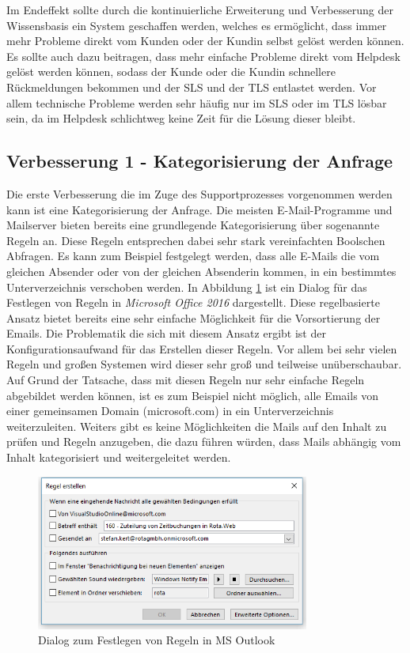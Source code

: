Im Endeffekt sollte durch die kontinuierliche Erweiterung und Verbesserung der Wissensbasis ein System geschaffen werden, welches es ermöglicht, dass immer mehr Probleme direkt vom Kunden oder der Kundin selbst gelöst werden können. Es sollte auch dazu beitragen, dass mehr einfache Probleme direkt vom Helpdesk gelöst werden können, sodass der Kunde oder die Kundin schnellere Rückmeldungen bekommen und der SLS und der TLS entlastet werden. Vor allem technische Probleme werden sehr häufig nur im SLS oder im TLS lösbar sein, da im Helpdesk schlichtweg keine Zeit für die Lösung dieser bleibt. 

\subsection{Verbesserung 1 - Kategorisierung der Anfrage}
\label{sec:improvement1}
Die erste Verbesserung die im Zuge des Supportprozesses vorgenommen werden kann ist eine Kategorisierung der Anfrage. Die meisten E-Mail-Programme und Mailserver bieten bereits eine grundlegende Kategorisierung über sogenannte Regeln an. Diese Regeln entsprechen dabei sehr stark vereinfachten Boolschen Abfragen. Es kann zum Beispiel festgelegt werden, dass alle E-Mails die vom gleichen Absender oder von der gleichen Absenderin kommen, in ein bestimmtes Unterverzeichnis verschoben werden. In Abbildung \ref{fig:outlook-rules} ist ein Dialog für das Festlegen von Regeln in \textit{Microsoft Office 2016} dargestellt. Diese regelbasierte Ansatz bietet bereits eine sehr einfache Möglichkeit für die Vorsortierung der Emails. Die Problematik die sich mit diesem Ansatz ergibt ist der Konfigurationsaufwand für das Erstellen dieser Regeln. Vor allem bei sehr vielen Regeln und großen Systemen wird dieser sehr groß und teilweise unüberschaubar. Auf Grund der Tatsache, dass mit diesen Regeln nur sehr einfache Regeln abgebildet werden können, ist es zum Beispiel nicht möglich, alle Emails von einer gemeinsamen Domain (microsoft.com) in ein Unterverzeichnis weiterzuleiten. Weiters gibt es keine Möglichkeiten die Mails auf den Inhalt zu prüfen und Regeln anzugeben, die dazu führen würden, dass Mails abhängig vom Inhalt kategorisiert und weitergeleitet werden.

\begin{figure}[ht]
	\centering
		\includegraphics[width=0.80\textwidth]{images/outlook_rules.PNG}
	\caption{Dialog zum Festlegen von Regeln in MS Outlook}
	\label{fig:outlook-rules}
\end{figure}

